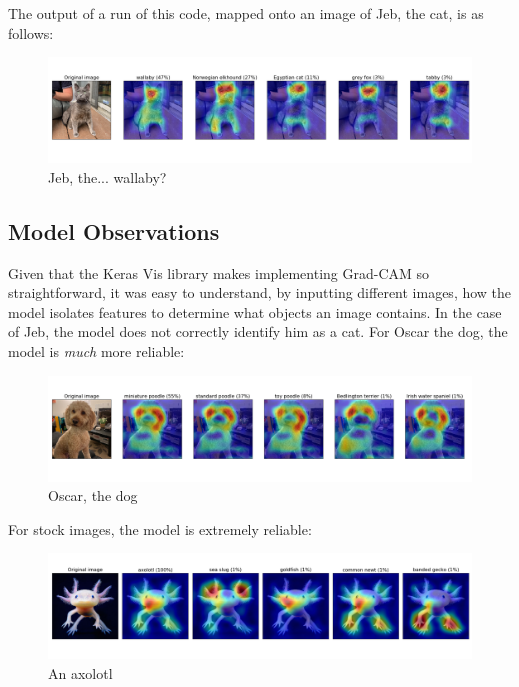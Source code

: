 \documentclass{article}
\begin{document}
\par The output of a run of this code, mapped onto an image of Jeb, the cat, is as follows:
\begin{figure}[H]
    \centering
    \includegraphics[width=6in]{csci-8110/hw-2/images/jeb_output.png}
    \caption{Jeb, the... wallaby?}
    \label{fig:jeb}
\end{figure}


\subsection{Model Observations}
\par Given that the Keras Vis library makes implementing Grad-CAM so straightforward, it was easy to understand, by inputting different images, how the model isolates features to determine what objects an image contains.
In the case of Jeb, the model does not correctly identify him as a cat.
For Oscar the dog, the model is \textit{much} more reliable:

\begin{figure}[H]
    \centering
    \includegraphics[width=6in]{csci-8110/hw-2/images/oscar_output.png}
    \caption{Oscar, the dog}
    \label{fig:oscar}
\end{figure}

\par For stock images, the model is extremely reliable:

\begin{figure}[H]
    \centering
    \includegraphics[width=6in]{csci-8110/hw-2/images/axolotl_output.png}
    \caption{An axolotl}
    \label{fig:axolotl}
\end{figure}
\end{document}
